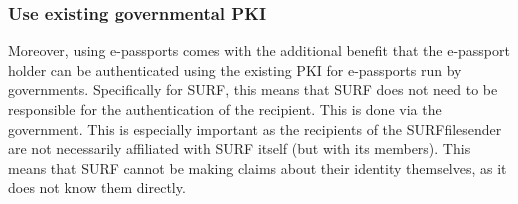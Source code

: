 \subsubsection{Use existing governmental PKI}\label{subsubsec:use-existing-governmental-pki}
Moreover, using e-passports comes with the additional benefit that the e-passport holder can be authenticated using the existing PKI for e-passports run by governments.
Specifically for SURF, this means that SURF does not need to be responsible for the authentication of the recipient.
This is done via the government.
This is especially important as the recipients of the SURFfilesender are not necessarily affiliated with SURF itself (but with its members).
This means that SURF cannot be making claims about their identity themselves, as it does not know them directly.
